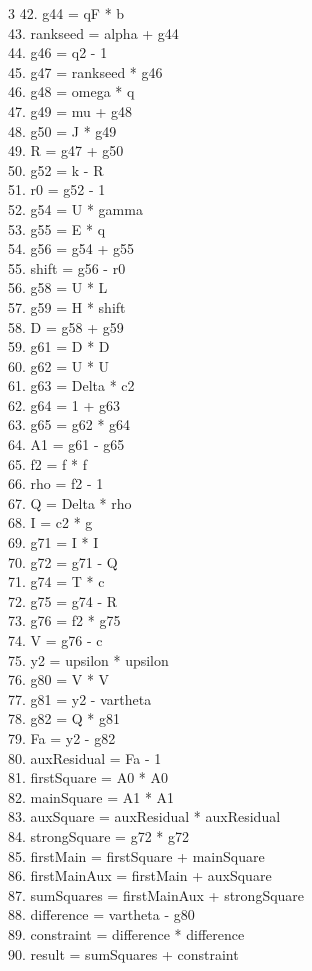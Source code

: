 \documentclass[10pt]{article}
\begin{document}
\begin{multicols}{3}
42. g44 = qF * b\\
43. rankseed = alpha + g44\\
44. g46 = q2 - 1\\
45. g47 = rankseed * g46\\
46. g48 = omega * q\\
47. g49 = mu + g48\\
48. g50 = J * g49\\
49. R = g47 + g50\\
50. g52 = k - R\\
51. r0 = g52 - 1\\
52. g54 = U * gamma\\
53. g55 = E * q\\
54. g56 = g54 + g55\\
55. shift = g56 - r0\\
56. g58 = U * L\\
57. g59 = H * shift\\
58. D = g58 + g59\\
59. g61 = D * D\\
60. g62 = U * U\\
61. g63 = Delta * c2\\
62. g64 = 1 + g63\\
63. g65 = g62 * g64\\
64. A1 = g61 - g65\\
65. f2 = f * f\\
66. rho = f2 - 1\\
67. Q = Delta * rho\\
68. I = c2 * g\\
69. g71 = I * I\\
70. g72 = g71 - Q\\
71. g74 = T * c\\
72. g75 = g74 - R\\
73. g76 = f2 * g75\\
74. V = g76 - c\\
75. y2 = upsilon * upsilon\\
76. g80 = V * V\\
77. g81 = y2 - vartheta\\
78. g82 = Q * g81\\
79. Fa = y2 - g82\\
80. auxResidual = Fa - 1\\
81. firstSquare = A0 * A0\\
82. mainSquare = A1 * A1\\
83. auxSquare = auxResidual * auxResidual\\
84. strongSquare = g72 * g72\\
85. firstMain = firstSquare + mainSquare\\
86. firstMainAux = firstMain + auxSquare\\
87. sumSquares = firstMainAux + strongSquare\\
88. difference = vartheta - g80\\
89. constraint = difference * difference\\
90. result = sumSquares + constraint\\
\end{multicols}
\end{document}

